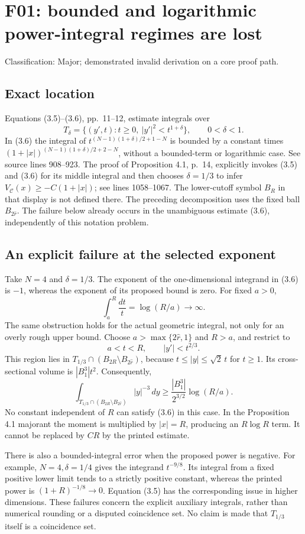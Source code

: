 \documentclass[10pt]{article}
\begin{document}
\section*{F01: bounded and logarithmic power-integral regimes are lost}
Classification: Major; demonstrated invalid derivation on a core proof path.\par
\subsection*{Exact location}
Equations (3.5)–(3.6), pp. 11–12, estimate integrals over \[T_\delta=\{(y',t):t\geq0,\ |y'|^2<t^{1+\delta}\},\qquad 0<\delta<1.\] In (3.6) the integral of \(t^{(N-1)(1+\delta)/2+1-N}\) is bounded by a constant times \((1+|x|)^{(N-1)(1+\delta)/2+2-N}\), without a bounded-term or logarithmic case. See source lines 908–923. The proof of Proposition 4.1, p. 14, explicitly invokes (3.5) and (3.6) for its middle integral and then chooses \(\delta=1/3\) to infer \(V_{\mathcal C}(x)\geq-C(1+|x|)\); see lines 1058–1067. The lower-cutoff symbol \(B_R\) in that display is not defined there. The preceding decomposition uses the fixed ball \(B_{2\widehat r}\). The failure below already occurs in the unambiguous estimate (3.6), independently of this notation problem.\par
\subsection*{An explicit failure at the selected exponent}
Take \(N=4\) and \(\delta=1/3\). The exponent of the one-dimensional integrand in (3.6) is \(-1\), whereas the exponent of its proposed bound is zero. For fixed \(a>0\), \[\int_a^R\frac{dt}{t}=\log(R/a)\longrightarrow\infty.\] The same obstruction holds for the actual geometric integral, not only for an overly rough upper bound. Choose \(a>\max\{2\widehat r,1\}\) and \(R>a\), and restrict to \[a<t<R,\qquad |y'|<t^{2/3}.\] This region lies in \(T_{1/3}\cap(B_{2R}\setminus B_{2\widehat r})\), because \(t\leq|y|\leq\sqrt2\,t\) for \(t\geq1\). Its cross-sectional volume is \(|B_1^3|t^2\). Consequently, \[\int_{T_{1/3}\cap(B_{2R}\setminus B_{2\widehat r})}|y|^{-3}\,dy
 \geq \frac{|B_1^3|}{2^{3/2}}\log(R/a).\] No constant independent of \(R\) can satisfy (3.6) in this case. In the Proposition 4.1 majorant the moment is multiplied by \(|x|=R\), producing an \(R\log R\) term. It cannot be replaced by \(CR\) by the printed estimate.\par
There is also a bounded-integral error when the proposed power is negative. For example, \(N=4,\delta=1/4\) gives the integrand \(t^{-9/8}\). Its integral from a fixed positive lower limit tends to a strictly positive constant, whereas the printed power is \((1+R)^{-1/8}\to0\). Equation (3.5) has the corresponding issue in higher dimensions. These failures concern the explicit auxiliary integrals, rather than numerical rounding or a disputed coincidence set. No claim is made that \(T_{1/3}\) itself is a coincidence set.\par
\end{document}
